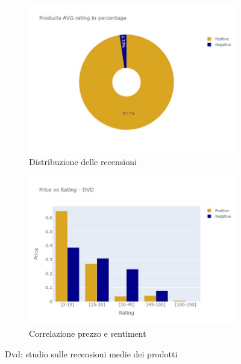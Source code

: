 		\begin{figure} [h]
			\centering
			\begin{subfigure}{0.48\textwidth}
				\includegraphics[width=\textwidth]{Figure/pie_dvd}
				\caption{Distribuzione delle recensioni}
				\label{fig:pie_dvd}
			\end{subfigure}
			\begin{subfigure}{0.48\textwidth}
				\includegraphics[width=\textwidth]{Figure/priceVSrating_dvd}
				\caption{Correlazione prezzo e sentiment}
				\label{fig:priceVSrating_dvd}
			\end{subfigure}
			\caption{Dvd: studio sulle recensioni medie dei prodotti}\label{fig:price_raiting_dvd}
		\end{figure}
	
	
